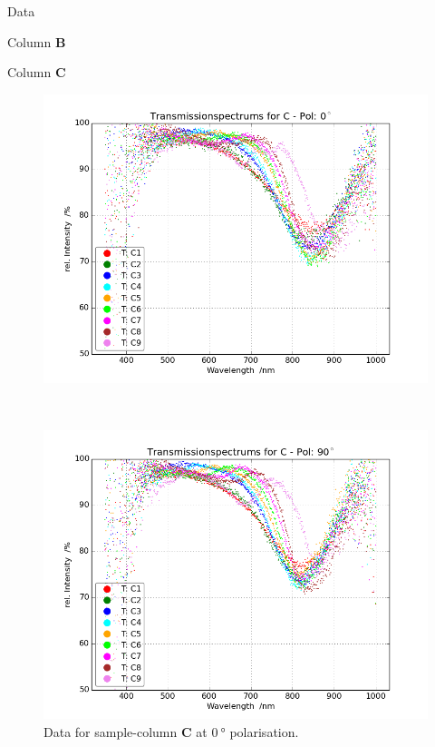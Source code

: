 \begin{appendix}
\begin{chapter}{Data}
\begin{section}{Column \textbf{B}}
    \end{section}
    
    
    
    \newpage
    \begin{section}{Column \textbf{C}}
      \label{Appendix:DataC}
      
      \begin{figure}[ht!]
        \centering
        \begin{minipage}{.92\textwidth}
          \centering
          \includegraphics[width=\textwidth]{Figures/TransspecRAW_CPol0.png}
          \caption{Data for sample-column \textbf{C} at $\SI{0}{\degree}$
              polarisation.}
          \label{fig:TransspecRAW_CPol0}
        \end{minipage}\\
        \begin{minipage}{.92\textwidth}
          \centering
          \includegraphics[width=\textwidth]{Figures/TransspecRAW_CPol90.png}

\end{minipage}
\end{figure}
\end{section}
\end{chapter}
\end{appendix}
